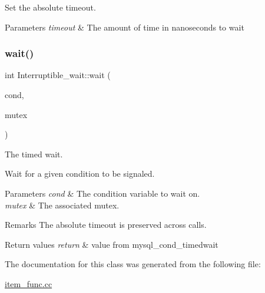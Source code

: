 Set the absolute timeout.


\begin{DoxyParams}{Parameters}
{\em timeout} & The amount of time in nanoseconds to wait \\
\hline
\end{DoxyParams}
\mbox{\label{classInterruptible__wait_ae91a46ef68f95f016291b82c101e081e}} 
\subsubsection{\texorpdfstring{wait()}{wait()}}
{\footnotesize\ttfamily int Interruptible\+\_\+wait\+::wait (\begin{DoxyParamCaption}\item[{mysql\+\_\+cond\+\_\+t $\ast$}]{cond,  }\item[{mysql\+\_\+mutex\+\_\+t $\ast$}]{mutex }\end{DoxyParamCaption})}

The timed wait.

Wait for a given condition to be signaled.


\begin{DoxyParams}{Parameters}
{\em cond} & The condition variable to wait on. \\
\hline
{\em mutex} & The associated mutex.\\
\hline
\end{DoxyParams}
\begin{DoxyRemark}{Remarks}
The absolute timeout is preserved across calls.
\end{DoxyRemark}

\begin{DoxyRetVals}{Return values}
{\em return} & value from mysql\+\_\+cond\+\_\+timedwait \\
\hline
\end{DoxyRetVals}


The documentation for this class was generated from the following file\+:\begin{DoxyCompactItemize}
\item 
\mbox{\hyperlink{item__func_8cc}{item\+\_\+func.\+cc}}\end{DoxyCompactItemize}
